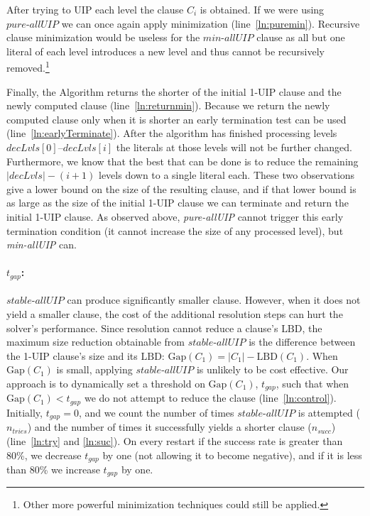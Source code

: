 \documentclass[runningheads]{llncs}
\newcommand{\LBD}{\text{LBD}\xspace}
\newcommand{\gap}{\text{Gap}}
\newcommand{\tgap}{t_{\mathit{gap}}}
\newcommand{\ntries}{n_{\mathit{tries}}}
\newcommand{\nsuc}{n_{\mathit{succ}}}
\newcommand{\allUip}{\textit{stable-allUIP}}
\newcommand{\allUipPure}{\textit{pure-allUIP}\xspace}
\newcommand{\allUipMin}{\textit{min-allUIP}\xspace}
\newcommand{\dlevels}{\ensuremath{\mathit{decLvls}}}
\begin{document}
After trying to UIP each level the clause $C_i$ is obtained. If we
were using $\allUipPure$ we can once again apply minimization
(line~\ref{ln:puremin}). Recursive clause minimization
\cite{DBLP:conf/sat/SorenssonB09} would be useless for the $\allUipMin$
clause as all but one literal of each level introduces a new level and
thus cannot be recursively removed.\footnote{Other more powerful
  minimization techniques could still be applied.} 

Finally, the Algorithm returns the shorter of the initial 1-UIP clause
and the newly computed clause (line~\ref{ln:returnmin}). Because we
return the newly computed clause only when it is shorter an early
termination test can be used (line~\ref{ln:earlyTerminate}). After the
algorithm has finished processing levels $\dlevels[0]$--$\dlevels[i]$
the literals at those levels will not be further changed. Furthermore,
we know that the best that can be done is to reduce the remaining
$|\dlevels| - (i+1)$ levels down to a single literal each. These two
observations give a lower bound on the size of the resulting clause,
and if that lower bound is as large as the size of the initial 1-UIP
clause we can terminate and return the initial 1-UIP clause. As
observed above, \allUipPure cannot trigger this early termination
condition (it cannot increase the size of any processed level), but
\allUipMin can.

\paragraph{$\tgap$:}
$\allUip$ can produce significantly smaller clause. However, when it
does not yield a smaller clause, the cost of the additional resolution
steps can hurt the solver's performance. Since resolution cannot
reduce a clause's $\LBD$, the maximum size reduction obtainable from
$\allUip$ is the difference between the 1-UIP clause's size and its
$\LBD$: $\gap(C_1) = |C_1| - \LBD(C_1)$. When $\gap(C_1)$ is small,
applying $\allUip$ is unlikely to be cost effective. Our approach is
to dynamically set a threshold on $\gap(C_1)$, $\tgap$, such that when
$\gap(C_1) < \tgap$ we do not attempt to reduce the clause
(line~\ref{ln:control}). Initially, $\tgap = 0$, and we count the
number of times $\allUip$ is attempted ($\ntries$) and the number of
times it successfully yields a shorter clause ($\nsuc$)
(line~\ref{ln:try} and \ref{ln:suc}). On every restart if the success
rate is greater  than 80\%, we decrease $\tgap$ by one (not allowing it to
become negative), and if it is less than 80\% we increase $\tgap$
by one.
\end{document}
